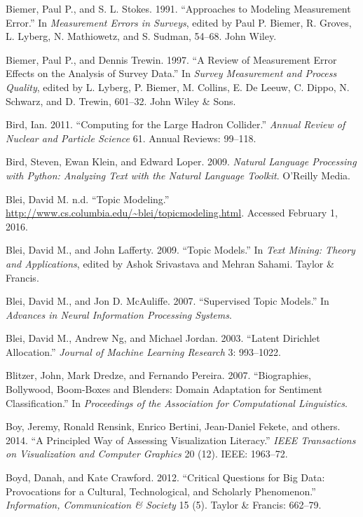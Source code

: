 \documentclass[]{krantz}
\begin{document}
\hypertarget{ref-BiemerStokes1991}{}
Biemer, Paul P., and S. L. Stokes. 1991. ``Approaches to Modeling
Measurement Error.'' In \emph{Measurement Errors in Surveys}, edited by
Paul P. Biemer, R. Groves, L. Lyberg, N. Mathiowetz, and S. Sudman,
54--68. John Wiley.

\hypertarget{ref-biemer1997review}{}
Biemer, Paul P., and Dennis Trewin. 1997. ``A Review of Measurement
Error Effects on the Analysis of Survey Data.'' In \emph{Survey
Measurement and Process Quality}, edited by L. Lyberg, P. Biemer, M.
Collins, E. De Leeuw, C. Dippo, N. Schwarz, and D. Trewin, 601--32. John
Wiley \& Sons.

\hypertarget{ref-bird2011computing}{}
Bird, Ian. 2011. ``Computing for the Large Hadron Collider.''
\emph{Annual Review of Nuclear and Particle Science} 61. Annual Reviews:
99--118.

\hypertarget{ref-bird-09}{}
Bird, Steven, Ewan Klein, and Edward Loper. 2009. \emph{Natural Language
Processing with Python: Analyzing Text with the Natural Language
Toolkit}. O'Reilly Media.

\hypertarget{ref-BleiTM}{}
Blei, David M. n.d. ``Topic Modeling.''
\url{http://www.cs.columbia.edu/~blei/topicmodeling.html}. Accessed
February 1, 2016.

\hypertarget{ref-blei-09}{}
Blei, David M., and John Lafferty. 2009. ``Topic Models.'' In \emph{Text
Mining: Theory and Applications}, edited by Ashok Srivastava and Mehran
Sahami. Taylor \& Francis.

\hypertarget{ref-blei-07b}{}
Blei, David M., and Jon D. McAuliffe. 2007. ``Supervised Topic Models.''
In \emph{Advances in Neural Information Processing Systems}.

\hypertarget{ref-blei-03}{}
Blei, David M., Andrew Ng, and Michael Jordan. 2003. ``Latent Dirichlet
Allocation.'' \emph{Journal of Machine Learning Research} 3: 993--1022.

\hypertarget{ref-blitzer-07}{}
Blitzer, John, Mark Dredze, and Fernando Pereira. 2007. ``Biographies,
Bollywood, Boom-Boxes and Blenders: Domain Adaptation for Sentiment
Classification.'' In \emph{Proceedings of the Association for
Computational Linguistics}.

\hypertarget{ref-boy2014principled}{}
Boy, Jeremy, Ronald Rensink, Enrico Bertini, Jean-Daniel Fekete, and
others. 2014. ``A Principled Way of Assessing Visualization Literacy.''
\emph{IEEE Transactions on Visualization and Computer Graphics} 20 (12).
IEEE: 1963--72.

\hypertarget{ref-boyd2012critical}{}
Boyd, Danah, and Kate Crawford. 2012. ``Critical Questions for Big Data:
Provocations for a Cultural, Technological, and Scholarly Phenomenon.''
\emph{Information, Communication \& Society} 15 (5). Taylor \& Francis:
662--79.
\end{document}
